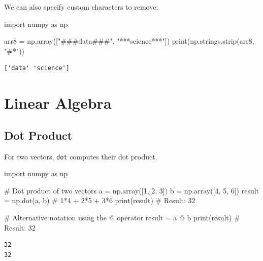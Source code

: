 \documentclass[
  english,
  letterpaper,
  DIV=11,
  numbers=noendperiod]{scrreprt}
\newenvironment{Shaded}{\begin{snugshade}}{\end{snugshade}}
\newcommand{\BuiltInTok}[1]{\textcolor[rgb]{0.00,0.23,0.31}{#1}}
\newcommand{\CommentTok}[1]{\textcolor[rgb]{0.37,0.37,0.37}{#1}}
\newcommand{\DecValTok}[1]{\textcolor[rgb]{0.68,0.00,0.00}{#1}}
\newcommand{\ImportTok}[1]{\textcolor[rgb]{0.00,0.46,0.62}{#1}}
\newcommand{\NormalTok}[1]{\textcolor[rgb]{0.00,0.23,0.31}{#1}}
\newcommand{\OperatorTok}[1]{\textcolor[rgb]{0.37,0.37,0.37}{#1}}
\newcommand{\StringTok}[1]{\textcolor[rgb]{0.13,0.47,0.30}{#1}}
\begin{document}
We can also specify custom characters to remove:

\begin{Shaded}
\begin{Highlighting}[]
\ImportTok{import}\NormalTok{ numpy }\ImportTok{as}\NormalTok{ np}

\NormalTok{arr8 }\OperatorTok{=}\NormalTok{ np.array([}\StringTok{"\#\#\#data\#\#\#"}\NormalTok{, }\StringTok{"***science***"}\NormalTok{])}
\BuiltInTok{print}\NormalTok{(np.strings.strip(arr8, }\StringTok{"\#*"}\NormalTok{))}
\end{Highlighting}
\end{Shaded}

\begin{verbatim}
['data' 'science']
\end{verbatim}

\chapter{Linear Algebra}\label{linear-algebra}

\section{Dot Product}\label{dot-product}

For two vectors, \texttt{dot} computes their dot product.

\begin{Shaded}
\begin{Highlighting}[]
\ImportTok{import}\NormalTok{ numpy }\ImportTok{as}\NormalTok{ np}

\CommentTok{\# Dot product of two vectors}
\NormalTok{a }\OperatorTok{=}\NormalTok{ np.array([}\DecValTok{1}\NormalTok{, }\DecValTok{2}\NormalTok{, }\DecValTok{3}\NormalTok{])}
\NormalTok{b }\OperatorTok{=}\NormalTok{ np.array([}\DecValTok{4}\NormalTok{, }\DecValTok{5}\NormalTok{, }\DecValTok{6}\NormalTok{])}
\NormalTok{result }\OperatorTok{=}\NormalTok{ np.dot(a, b)  }\CommentTok{\# 1*4 + 2*5 + 3*6}
\BuiltInTok{print}\NormalTok{(result)  }\CommentTok{\# Result: 32}

\CommentTok{\# Alternative notation using the @ operator}
\NormalTok{result }\OperatorTok{=}\NormalTok{ a }\OperatorTok{@}\NormalTok{ b}
\BuiltInTok{print}\NormalTok{(result)  }\CommentTok{\# Result: 32}
\end{Highlighting}
\end{Shaded}

\begin{verbatim}
32
32
\end{verbatim}
\end{document}
